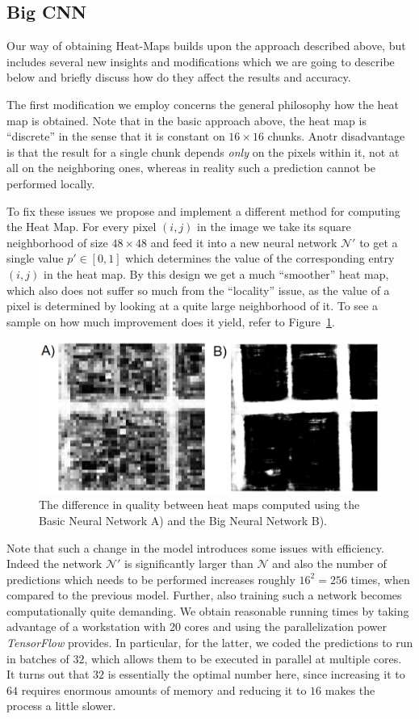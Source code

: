 \documentclass[10pt,conference,compsocconf]{IEEEtran}
\newcommand{\cN}{\mathcal{N}}
\begin{document}
\subsection{Big CNN}
Our way of obtaining Heat-Maps builds upon the approach described above, but includes several new insights and modifications which we are going to describe below and briefly discuss how do they affect the results and accuracy.

The first modification we employ concerns the general philosophy how the heat map is obtained. Note that in the basic approach above, the heat map is ``discrete'' in the sense that it is constant on $16 \times 16$ chunks. Anotr disadvantage is that the result for a single chunk depends \emph{only} on the pixels within it, not at all on the neighboring ones, whereas in reality such a prediction cannot be performed locally.

To fix these issues we propose and implement a different method for computing the Heat Map. For every pixel $(i,j)$ in the image we take its square neighborhood of size $48\times 48$ and feed it into a new neural network $\cN'$ to get a single value $p'\in [0,1]$ which determines the value of the corresponding entry $(i,j)$ in the heat map. By this design we get a much ``smoother'' heat map, which also does not suffer so much from the ``locality'' issue, as the value of a pixel is determined by looking at a quite large neighborhood of it. To see a sample on how much improvement does it yield, refer to Figure~\ref{fig:smallbig}.
\begin{figure}
\includegraphics[scale=0.42]{smallbig.png}
\caption{The difference in quality between heat maps computed using the Basic Neural Network A) and the Big Neural Network B).}
\label{fig:smallbig}
\end{figure}
Note that such a change in the model introduces some issues with efficiency. Indeed the network $\cN'$ is significantly larger than $\cN$ and also the number of predictions which needs to be performed increases roughly $16^2=256$ times, when compared to the previous model. Further, also training such a network becomes computationally quite demanding. We obtain reasonable running times by taking advantage of a workstation with 20 cores and using the parallelization power {\it TensorFlow} provides. In particular, for the latter, we coded the predictions to run in batches of $32$, which allows them to be executed in parallel at multiple cores. It turns out that $32$ is essentially the optimal number here, since increasing it to $64$ requires enormous amounts of memory and reducing it to $16$ makes the process a little slower.
\end{document}
